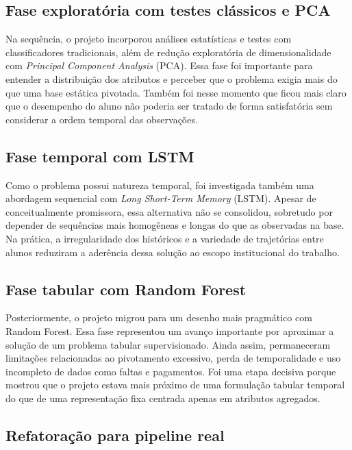 \subsection{Fase explorat\'oria com testes cl\'assicos e PCA}
\label{subsec:fase-pca}

Na sequ\^encia, o projeto incorporou an\'alises estat\'isticas e testes com classificadores tradicionais, al\'em de redu\c{c}\~ao explorat\'oria de dimensionalidade com \textit{Principal Component Analysis} (PCA). Essa fase foi importante para entender a distribui\c{c}\~ao dos atributos e perceber que o problema exigia mais do que uma base est\'atica pivotada. Tamb\'em foi nesse momento que ficou mais claro que o desempenho do aluno n\~ao poderia ser tratado de forma satisfat\'oria sem considerar a ordem temporal das observa\c{c}\~oes.

\subsection{Fase temporal com LSTM}
\label{subsec:fase-lstm}

Como o problema possui natureza temporal, foi investigada tamb\'em uma abordagem sequencial com \textit{Long Short-Term Memory} (LSTM). Apesar de conceitualmente promissora, essa alternativa n\~ao se consolidou, sobretudo por depender de sequ\^encias mais homog\^eneas e longas do que as observadas na base. Na pr\'atica, a irregularidade dos hist\'oricos e a variedade de trajet\'orias entre alunos reduziram a ader\^encia dessa solu\c{c}\~ao ao escopo institucional do trabalho.

\subsection{Fase tabular com Random Forest}
\label{subsec:fase-random-forest}

Posteriormente, o projeto migrou para um desenho mais pragm\'atico com Random Forest. Essa fase representou um avan\c{c}o importante por aproximar a solu\c{c}\~ao de um problema tabular supervisionado. Ainda assim, permaneceram limita\c{c}\~oes relacionadas ao pivotamento excessivo, perda de temporalidade e uso incompleto de dados como faltas e pagamentos. Foi uma etapa decisiva porque mostrou que o projeto estava mais pr\'oximo de uma formula\c{c}\~ao tabular temporal do que de uma representa\c{c}\~ao fixa centrada apenas em atributos agregados.

\subsection{Refatora\c{c}\~ao para pipeline real}
\label{subsec:fase-pipeline-real}

